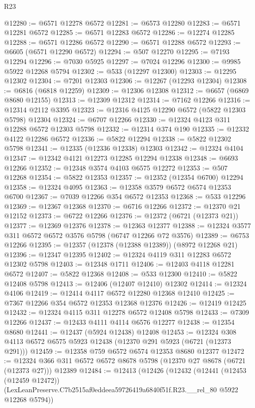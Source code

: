 \begin{lexlean}{R23}
\begin{coremodule}
@12280 := @6571 @12278 @6572
@12281 := @6573 @12280
@12283 := @6571 @12281 @6572
@12285 := @6571 @12283 @6572
@12286 := @12274 @12285
@12288 := @6571 @12286 @6572
@12290 := @6571 @12288 @6572
@12293 := @6605 (@6571 @12290 @6572)
@12294 := @507 @12270
@12295 := @7193 @12294
@12296 := @7030 @5925
@12297 := @7024 @12296
@12300 := @9985 @5922 @12268 @5794
@12302 := @533 (@12297 @12300)
@12303 := @12295 @12302
@12304 := @7201 @12303
@12306 := @12267 (@12293 @12304)
@12308 := @6816 (@6818 @12259)
@12309 := @12306 @12308
@12312 := @6657 (@6869 @8680 @12155)
@12313 := @12309 @12312
@12314 := @7162 @12266
@12316 := @12314 @2112 @3395
@12323 := @12316 @4125 @12290 @6572 (@5822 @12303 @5798) @12304
@12324 := @6707 @12266
@12330 := @12324 @4123 @311 @12288 @6572 @12303 @5798
@12332 := @12314 @374 @190
@12335 := @12332 @4122 @12286 @6572
@12336 := @5822 @12294
@12338 := @5822 @12302 @5798
@12341 := @12335 (@12336 @12338) @12303
@12342 := @12324 @4104
@12347 := @12342 @4121 @12273 @12285 @12294 @12338
@12348 := @6693 @12266
@12352 := @12348 @3574 @4103 @6575 @12272
@12353 := @507 @12268
@12354 := @5822 @12353
@12357 := @12352 (@12354 @6700) @12294
@12358 := @12324 @4095
@12363 := @12358 @3579 @6572 @6574 @12353 @6700
@12367 := @7039 @12266 @354 @6572 @12353
@12368 := @533 @12296
@12369 := @12367 @12368
@12370 := @6716 @12266
@12372 := @12370 @21 @12152
@12373 := @6722 @12266
@12376 := @12372 (@6721 (@12373 @21))
@12377 := @12369 @12376
@12378 := @12363 @12377
@12388 := @12324 @3577 @311 @6572 @6572 @3576 @5798 (@6747 @12266 @72 @3576)
@12389 := @6753 @12266
@12395 := @12357 (@12378 (@12388 @12389)) (@8972 @12268 @21)
@12396 := @12347 @12395
@12402 := @12324 @4119 @311 @12283 @6572 @12302 @5798
@12403 := @12348 @1711
@12406 := @12403 @4118 @12281 @6572
@12407 := @5822 @12368
@12408 := @533 @12300
@12410 := @5822 @12408 @5798
@12413 := @12406 (@12407 @12410) @12302
@12414 := @12324 @4106
@12419 := @12414 @4117 @6572 @12280 @12368 @12410
@12425 := @7367 @12266 @354 @6572 @12353 @12368 @12376
@12426 := @12419 @12425
@12432 := @12324 @4115 @311 @12278 @6572 @12408 @5798
@12433 := @7309 @12266
@12437 := @12433 @4111 @4114 @6576 @12277
@12438 := @12354 @8680
@12441 := @12437 (@5924 @12438) @12408
@12453 := @12324 @308 @4113 @6572 @6575 @5923 @12438 (@12370 @291 @5923 (@6721 (@12373 @291)))
@12459 := @12358 @759 @6572 @6574 @12353 @8680 @12377
@12472 := @12324 @366 @311 @6572 @6572 @8678 @5798 (@12370 @27 @8678 (@6721 (@12373 @27))) @12389
@12484 := @12413
    (@12426
      (@12432
        (@12441
          (@12453 (@12459 @12472))
          (LexLeanPreserve.C7b2515af0eddeea59726419a6840f51f.R23.__rel_80 @5922 @12268 @5794))

\end{coremodule}
\end{lexlean}
